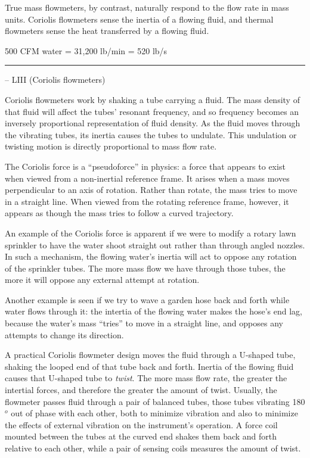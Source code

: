 \vskip 10pt

True mass flowmeters, by contrast, naturally respond to the flow rate in mass units.  Coriolis flowmeters sense the inertia of a flowing fluid, and thermal flowmeters sense the heat transferred by a flowing fluid.

\vskip 10pt

500 CFM water = 31,200 lb/min = 520 lb/s


\filbreak \vskip 5pt \hrule \vskip 5pt  -- LIII (Coriolis flowmeters) \vskip 10pt

Coriolis flowmeters work by shaking a tube carrying a fluid.  The mass density of that fluid will affect the tubes' resonant frequency, and so frequency becomes an inversely proportional representation of fluid density.  As the fluid moves through the vibrating tubes, its inertia causes the tubes to undulate.  This undulation or twisting motion is directly proportional to mass flow rate.

\vskip 10pt

The Coriolis force is a ``pseudoforce'' in physics: a force that appears to exist when viewed from a non-inertial reference frame.  It arises when a mass moves perpendicular to an axis of rotation.  Rather than rotate, the mass tries to move in a straight line.  When viewed from the rotating reference frame, however, it appears as though the mass tries to follow a curved trajectory.

\vskip 10pt

An example of the Coriolis force is apparent if we were to modify a rotary lawn sprinkler to have the water shoot straight out rather than through angled nozzles.  In such a mechanism, the flowing water's inertia will act to oppose any rotation of the sprinkler tubes.  The more mass flow we have through those tubes, the more it will oppose any external attempt at rotation.

Another example is seen if we try to wave a garden hose back and forth while water flows through it: the intertia of the flowing water makes the hose's end lag, because the water's mass ``tries'' to move in a straight line, and opposes any attempts to change its direction.

\vskip 10pt

A practical Coriolis flowmeter design moves the fluid through a U-shaped tube, shaking the looped end of that tube back and forth.  Inertia of the flowing fluid causes that U-shaped tube to {\it twist}.  The more mass flow rate, the greater the intertial forces, and therefore the greater the amount of twist.  Usually, the flowmeter passes fluid through a pair of balanced tubes, those tubes vibrating 180$^{o}$ out of phase with each other, both to minimize vibration and also to minimize the effects of external vibration on the instrument's operation.  A force coil mounted between the tubes at the curved end shakes them back and forth relative to each other, while a pair of sensing coils measures the amount of twist.  


